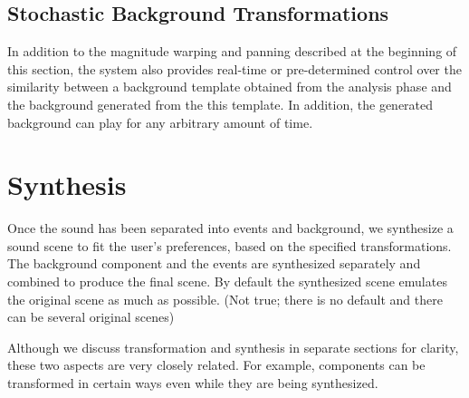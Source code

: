 \documentclass{acmsiggraph}               %
\begin{document}

\subsection{Stochastic Background Transformations}

In addition to the magnitude warping and panning described at the 
beginning of this section, the system also provides real-time or 
pre-determined control over the similarity between a background template 
obtained from the analysis phase and the background generated from 
the this template. In addition, the generated background can play for any 
arbitrary amount of time.




\section{Synthesis}

Once the sound has been separated into events and background, we synthesize a sound scene to fit 
the user's preferences, based on the specified transformations. The background 
component and the events are synthesized separately and combined to produce the 
final scene. By default the synthesized scene emulates the original scene as much 
as possible. (Not true; there is no default and there can be several original scenes)

Although we discuss transformation and synthesis in separate sections for clarity, these two 
aspects are very closely related. For example, components can be transformed in certain ways even 
while they are being synthesized. 
\end{document}
